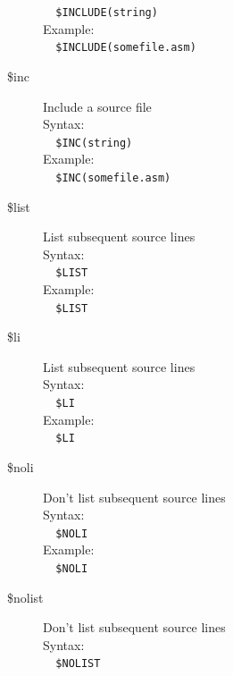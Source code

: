 \documentclass[a4paper,twoside,12pt]{book}
\begin{document}
\begin{description}
				\verb'  '{\color{highlight_control}\verb'$INCLUDE'}{\color{highlight_symbol}\verb'('}{\color{highlight_string}\verb'string'}{\color{highlight_symbol}\verb')'}\\
				Example:\\
				\verb'  '{\color{highlight_control}\verb'$INCLUDE'}{\color{highlight_symbol}\verb'('}{\color{highlight_string}\verb'somefile.asm'}{\color{highlight_symbol}\verb')'}\\
			\item[\$inc] Include a source file\\
				Syntax:\\
				\verb'  '{\color{highlight_control}\verb'$INC'}{\color{highlight_symbol}\verb'('}{\color{highlight_string}\verb'string'}{\color{highlight_symbol}\verb')'}\\
				Example:\\
				\verb'  '{\color{highlight_control}\verb'$INC'}{\color{highlight_symbol}\verb'('}{\color{highlight_string}\verb'somefile.asm'}{\color{highlight_symbol}\verb')'}\\
			\item[\$list] List subsequent source lines\\
				Syntax:\\
				\verb'  '{\color{highlight_control}\verb'$LIST'}\\
				Example:\\
				\verb'  '{\color{highlight_control}\verb'$LIST'}\\
			\item[\$li] List subsequent source lines\\
				Syntax:\\
				\verb'  '{\color{highlight_control}\verb'$LI'}\\
				Example:\\
				\verb'  '{\color{highlight_control}\verb'$LI'}\\
			\item[\$noli] Don't list subsequent source lines\\
				Syntax:\\
				\verb'  '{\color{highlight_control}\verb'$NOLI'}\\
				Example:\\
				\verb'  '{\color{highlight_control}\verb'$NOLI'}\\
			\item[\$nolist] Don't list subsequent source lines\\
				Syntax:\\
				\verb'  '{\color{highlight_control}\verb'$NOLIST'}\\

\end{description}
\end{document}
